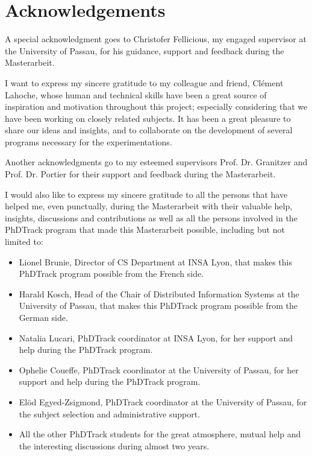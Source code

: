 \documentclass[11pt]{article} %
\begin{document}
\newpage
\section*{Acknowledgements}
A special acknowledgment goes to Christofer Fellicious, my engaged supervisor at the University of Passau, for his guidance, support and feedback during the Masterarbeit. 

I want to express my sincere gratitude to my colleague and friend, Clément Lahoche, whose human and technical skills have been a great source of inspiration and motivation throughout this project;  especially considering that we have been working on closely related subjects. It has been a great pleasure to share our ideas and insights, and to collaborate on the development of several programs necessary for the experimentations. 

Another acknowledgments go to my esteemed supervisors Prof. Dr. Granitzer and Prof. Dr. Portier for their support and feedback during the Masterarbeit. 

I would also like to express my sincere gratitude to all the persons that have helped me, even punctually, during the Masterarbeit with their valuable help, insights, discussions and contributions as well as all the persons involved in the PhDTrack program that made this Masterarbeit possible, including but not limited to: 
\begin{itemize}
    \item Lionel Brunie, Director of CS Department at INSA Lyon, that makes this PhDTrack program possible from the French side.
    \item Harald Kosch, Head of the Chair of Distributed Information Systems at the University of Passau, that makes this PhDTrack program possible from the German side.
    \item Natalia Lucari, PhDTrack coordinator at INSA Lyon, for her support and help during the PhDTrack program.
    \item Ophelie Coueffe, PhDTrack coordinator at the University of Passau, for her support and help during the PhDTrack program.
    \item Elöd Egyed-Zsigmond, PhDTrack coordinator at the University of Passau, for the subject selection and administrative support.
    \item All the other PhDTrack students for the great atmosphere, mutual help and the interesting discussions during almost two years.
\end{itemize}
\end{document}
